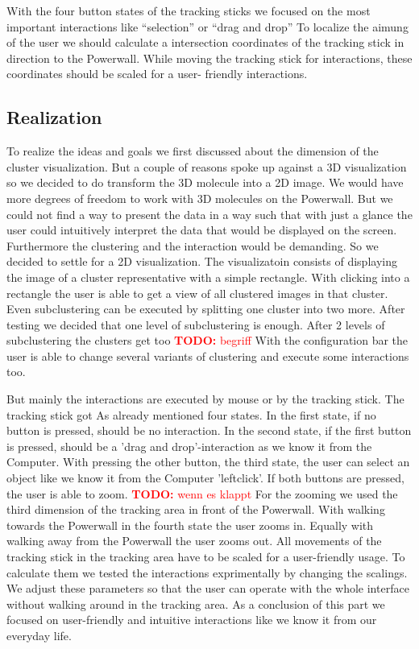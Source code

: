 \documentclass[journal]{vgtc}       %
\newcommand{\todo}[1]{\textcolor{red}{\textbf{TODO:} #1}}
\begin{document}
With the four button states of the tracking sticks we focused on the most important interactions like ``selection'' or ``drag and drop'' To localize the aimung of the user  we should calculate a intersection coordinates of the tracking stick in direction to the Powerwall. While moving the tracking stick for interactions, these coordinates should be scaled for a user- friendly interactions.

\subsection{Realization}

To realize the ideas and goals we first discussed about the dimension of the cluster visualization. But a couple of reasons spoke up against a 3D visualization so we decided to do transform the 3D molecule into a 2D image. We would have more degrees of freedom to work with 3D molecules on the Powerwall. But we could not find a way to present the data in a way such that with just a glance the user could intuitively interpret the data that would be displayed on the screen. Furthermore the clustering and the interaction would be demanding. So we decided to settle for a 2D visualization. 
The visualizatoin consists of displaying the image of a cluster representative with a simple rectangle. With clicking into a rectangle the user is able to get a view of all clustered images in that cluster. Even subclustering can be executed by splitting one cluster into two more. After testing we decided that one level of subclustering is enough. After 2 levels of subclustering the clusters get too  \todo{begriff}
With the configuration bar the user is able to change several variants of clustering and execute some interactions too. 

But mainly the interactions are executed by mouse or by the tracking stick. The tracking stick got As already mentioned four states. In the first state, if no button is pressed, should be no interaction. In the second state, if the first button is pressed, should be a 'drag and drop'-interaction as we know it from the Computer. With pressing the other button, the third state, the user can select an object like we know it from the Computer 'leftclick'. If both buttons are pressed, the user is able to zoom. \todo{wenn es klappt} For the zooming we used the third dimension of the tracking area in front of the Powerwall. With walking towards the Powerwall in the fourth state the user zooms in. Equally with walking away from the Powerwall the user zooms out. 
All movements of the tracking stick in the tracking area have to be scaled for a user-friendly usage. To calculate them we tested the interactions exprimentally by changing the scalings. We adjust these parameters so that the user can operate with the whole interface without walking around in the tracking area.
As a conclusion of this part we focused on user-friendly and intuitive interactions like we know it from our everyday life.
\end{document}

